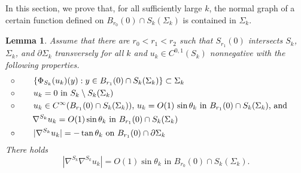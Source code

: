 \documentclass[11pt]{amsart}
\newtheorem{lem}[prop]{Lemma}
\begin{document}
In this section, we prove that, for all sufficiently large $k$,  the normal graph of  a certain function  defined on $B_{r_0}(0)\cap S_k(\Sigma_k)$ is contained in $\Sigma_k$.


	
\begin{lem} \label{prelim curvature estimates}
Assume that  there are $r_0<r_1<r_2$ such that $S_{r_1}(0)$ intersects  $S_k$, $\Sigma_k$, and $\partial \Sigma_k$ transversely for all $k$ and $ u_k\in C^{0,1}(S_k)$ nonnegative with the following properties.
 \begin{equation}\label{hessian estimate Sigma assumptions 0}
	\begin{aligned}
		&\circ\qquad \text{$ \{\Phi_{S_k}(u_k)(y):y\in B_{r_1}(0)\cap S_k(\Sigma_k)\}$}\subset \Sigma_k\hspace{5cm}\\ 		
		&\circ\qquad \text{$u_k=0$ in $S_k\setminus S_k(\Sigma_k)$} \\
		&\circ\qquad \text{$ u_k\in C^\infty(B_{r_1}(0)\cap S_k(\Sigma_k))$, $u_k=O(1)\,\sin\theta_k$ in $B_{r_1}(0)\cap S_k(\Sigma_k)$, and}
 			\\&\qquad  \text{\,\,\,\,\,$\nabla^{S_k} u_k=O(1) \sin\theta_k$ in $ B_{r_1}(0)\cap  S_k(\Sigma_k)$}\\ 
		&\circ\qquad \text{$|\nabla^{S_k} u_k|=-\tan\theta_k$ on $B_{r_1}(0)\cap \partial \Sigma_k $}
	\end{aligned}
	\end{equation}
	There holds
	$$
 \text{$|\nabla^{S_k}\nabla^{S_k} u_k|=O(1)\sin\theta_k$ in $B_{r_0}(0)\cap  S_k(\Sigma_k)$}.
	$$
\end{lem}
\end{document}
